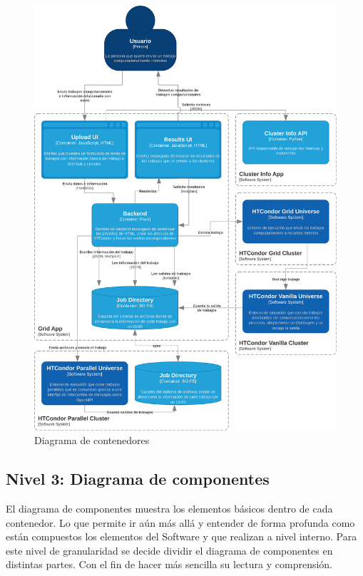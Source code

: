 \begin{figure}[H]
	\centering
	\includegraphics[scale=0.1]{tablas-images/C4/Diagramas HTCondor-Nivel 2.drawio.png}
	\caption{Diagrama de contenedores}
    \label{fig:C4Nivel2}
\end{figure}

\subsection{Nivel 3: Diagrama de componentes}
\noindent
El diagrama de componentes muestra los elementos básicos dentro de cada contenedor. Lo que permite ir aún más allá y entender de forma profunda como están compuestos los elementos del Software y que realizan a nivel interno. Para este nivel de granularidad se decide dividir el diagrama de componentes en distintas partes. Con el fin de hacer más sencilla su lectura y comprensión.


